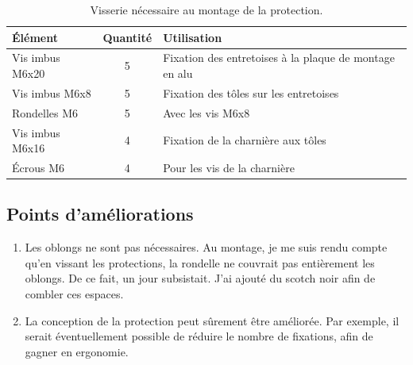 \begin{minipage}{\textwidth}



    \begin{table}[H]
        \centering
        \renewcommand{\arraystretch}{1.3}
        \begin{tabular}{|l|c|l|}
            \hline
            \textbf{Élément} & \textbf{Quantité} & \textbf{Utilisation}                                   \\
            \hline
            Vis imbus M6x20  & 5                 & Fixation des entretoises à la plaque de montage en alu \\
            Vis imbus M6x8   & 5                 & Fixation des tôles sur les entretoises                 \\
            Rondelles M6     & 5                 & Avec les vis M6x8                                      \\
            Vis imbus M6x16  & 4                 & Fixation de la charnière aux tôles                     \\
            Écrous M6        & 4                 & Pour les vis de la charnière                           \\
            \hline
        \end{tabular}
        \caption{Visserie nécessaire au montage de la protection. \cite{chatgptTableProtectionEntreeLaserVisserie}}
        \label{tab:visserie_protection}
    \end{table}
\end{minipage}
\subsection{Points d'améliorations}
\begin{enumerate}
    \item Les oblongs ne sont pas nécessaires. Au montage, je me suis rendu compte qu'en vissant les protections, la rondelle ne couvrait pas entièrement les oblongs. De ce fait, un jour subsistait. J'ai ajouté du scotch noir afin de combler ces espaces.
    \item La conception de la protection peut sûrement être améliorée. Par exemple, il serait éventuellement possible de réduire le nombre de fixations, afin de gagner en ergonomie.
\end{enumerate}
\clearpage
